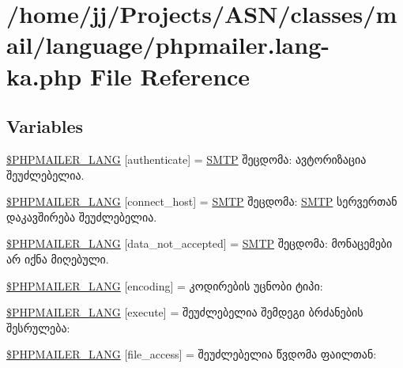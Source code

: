 \hypertarget{phpmailer_8lang-ka_8php}{}\section{/home/jj/\+Projects/\+A\+S\+N/classes/mail/language/phpmailer.lang-\/ka.php File Reference}
\label{phpmailer_8lang-ka_8php}
\subsection*{Variables}
\begin{DoxyCompactItemize}
\item 
\hyperlink{phpmailer_8lang-ka_8php_a2cb33073c989b85580748e331ed8b4aa}{\$\+P\+H\+P\+M\+A\+I\+L\+E\+R\+\_\+\+L\+A\+NG} \mbox{[}\textquotesingle{}authenticate\textquotesingle{}\mbox{]} = \textquotesingle{}\hyperlink{class_s_m_t_p}{S\+M\+TP} შეცდომა\+: ავტორიზაცია შეუძლებელია.\textquotesingle{}
\item 
\hyperlink{phpmailer_8lang-ka_8php_a2ee0cc637a06b96e45600db31c6799ee}{\$\+P\+H\+P\+M\+A\+I\+L\+E\+R\+\_\+\+L\+A\+NG} \mbox{[}\textquotesingle{}connect\+\_\+host\textquotesingle{}\mbox{]} = \textquotesingle{}\hyperlink{class_s_m_t_p}{S\+M\+TP} შეცდომა\+: \hyperlink{class_s_m_t_p}{S\+M\+TP} სერვერთან დაკავშირება შეუძლებელია.\textquotesingle{}
\item 
\hyperlink{phpmailer_8lang-ka_8php_a814c6b191205d2361b3233e9c9d6fda5}{\$\+P\+H\+P\+M\+A\+I\+L\+E\+R\+\_\+\+L\+A\+NG} \mbox{[}\textquotesingle{}data\+\_\+not\+\_\+accepted\textquotesingle{}\mbox{]} = \textquotesingle{}\hyperlink{class_s_m_t_p}{S\+M\+TP} შეცდომა\+: მონაცემები არ იქნა მიღებული.\textquotesingle{}
\item 
\hyperlink{phpmailer_8lang-ka_8php_a817f7283f3d54c970a0c10305cc668cc}{\$\+P\+H\+P\+M\+A\+I\+L\+E\+R\+\_\+\+L\+A\+NG} \mbox{[}\textquotesingle{}encoding\textquotesingle{}\mbox{]} = \textquotesingle{}კოდირების უცნობი ტიპი\+: \textquotesingle{}
\item 
\hyperlink{phpmailer_8lang-ka_8php_a668217a9563a168f30f2a8548b6ed5a9}{\$\+P\+H\+P\+M\+A\+I\+L\+E\+R\+\_\+\+L\+A\+NG} \mbox{[}\textquotesingle{}execute\textquotesingle{}\mbox{]} = \textquotesingle{}შეუძლებელია შემდეგი ბრძანების შესრულება\+: \textquotesingle{}
\item 
\hyperlink{phpmailer_8lang-ka_8php_a7e83349023b856ef9e5c46e30ae6d51e}{\$\+P\+H\+P\+M\+A\+I\+L\+E\+R\+\_\+\+L\+A\+NG} \mbox{[}\textquotesingle{}file\+\_\+access\textquotesingle{}\mbox{]} = \textquotesingle{}შეუძლებელია წვდომა ფაილთან\+: \textquotesingle{}

\end{DoxyCompactItemize}
